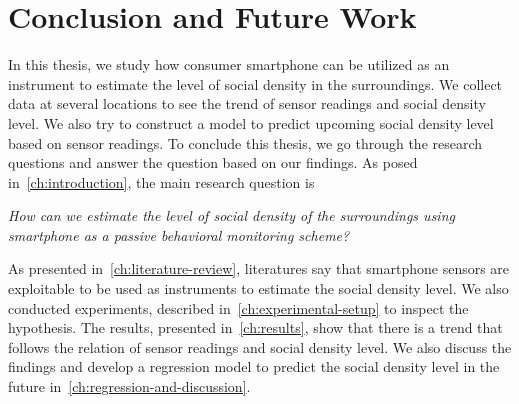 \chapter{Conclusion and Future Work}
\label{ch:conclusion-future-work} %
In this thesis, we study how consumer smartphone can be utilized as an instrument to estimate the level of social density in the surroundings. We collect data at several locations to see the trend of sensor readings and social density level. We also try to construct a model to predict upcoming social density level based on sensor readings. To conclude this thesis, we go through the research questions and answer the question based on our findings. As posed in~\autoref{ch:introduction}, the main research question is

\begin{displayquote}\textit{
How can we estimate the level of social density of the surroundings using smartphone as a passive behavioral monitoring scheme?}
\end{displayquote}

As presented in~\autoref{ch:literature-review}, literatures say that smartphone sensors are exploitable to be used as instruments to estimate the social density level. We also conducted experiments, described in~\autoref{ch:experimental-setup} to inspect the hypothesis. The results, presented in~\autoref{ch:results}, show that there is a trend that follows the relation of sensor readings and social density level. We also discuss the findings and develop a regression model to predict the social density level in the future in~\autoref{ch:regression-and-discussion}.

